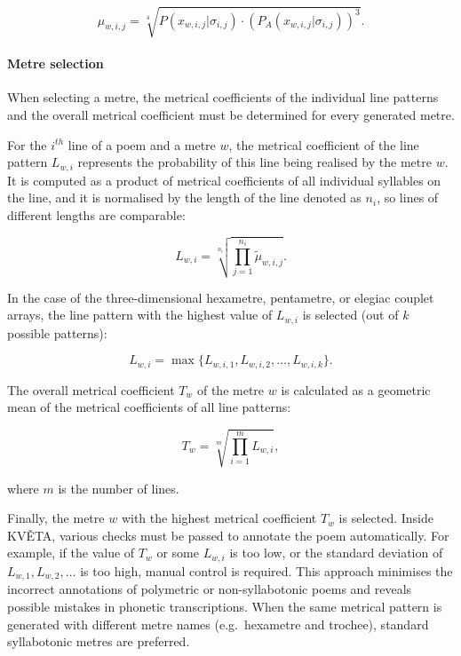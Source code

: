 \begin{equation}\label{eq:kveta-data-driven-1}
    \mu_{w,i,j} = \sqrt[4]{P(x_{w,i,j}|\sigma_{i,j})\cdot(P_A(x_{w,i,j}|\sigma_{i,j}))^3}.
\end{equation}

\paragraph{Metre selection}
When selecting a metre, the metrical coefficients of the individual line patterns and the overall metrical coefficient must be determined for every generated metre.

For the $i^{th}$ line of a poem and a metre $w$, the metrical coefficient of the line pattern $L_{w,i}$ represents the probability of this line being realised by the metre $w$. It is computed as a product of metrical coefficients of all individual syllables on the line, and it is normalised by the length of the line denoted as $n_i$, so lines of different lengths are comparable:

\begin{equation}\label{eq:kveta-data-driven-2}
    L_{w,i} = \sqrt[n_i]{\prod_{j=1}^{n_i}\tilde{\mu}_{w,i,j}}.
\end{equation}

In the case of the three-dimensional hexametre, pentametre, or elegiac couplet arrays, the line pattern with the highest value of $L_{w,i}$ is selected (out of $k$ possible patterns):

\begin{equation}\label{eq:kveta-data-driven-3}
    L_{w,i} = \max\{L_{w,i,1}, L_{w,i,2}, \ldots, L_{w,i,k}\}.
\end{equation}

The overall metrical coefficient $T_w$ of the metre $w$ is calculated as a geometric mean of the metrical coefficients of all line patterns:

\begin{equation}\label{eq:kveta-data-driven-4}
    T_w = \sqrt[m]{\prod_{i=1}^{m}L_{w,i}},
\end{equation}

where $m$ is the number of lines.

Finally, the metre $w$ with the highest metrical coefficient $T_w$ is selected. Inside KVĚTA, various checks must be passed to annotate the poem automatically. For example, if the value of $T_w$ or some $L_{w,i}$ is too low, or the standard deviation of $L_{w,1}, L_{w,2}, \ldots$ is too high, manual control is required. This approach minimises the incorrect annotations of polymetric or non-syllabotonic poems and reveals possible mistakes in phonetic transcriptions. When the same metrical pattern is generated with different metre names (e.g.~hexametre and trochee), standard syllabotonic metres are preferred.

